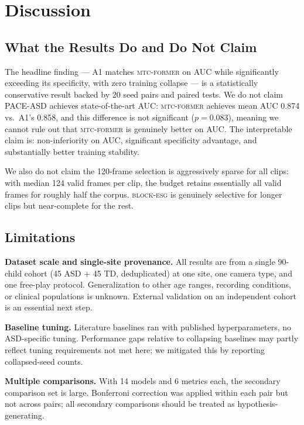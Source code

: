 \documentclass[a4paper,fleqn]{cas-sc}
\newcommand{\besg}{\textsc{block-esg}\xspace}
\newcommand{\mtcf}{\textsc{mtc-former}\xspace}
\begin{document}
\section{Discussion}
\label{sec:disc}

\subsection{What the Results Do and Do Not Claim}

The headline finding --- A1 matches \mtcf on AUC while significantly exceeding
its specificity, with zero training collapse --- is a statistically conservative
result backed by 20 seed pairs and paired tests.
We do not claim PACE-ASD achieves state-of-the-art AUC: \mtcf achieves mean
AUC 0.874 vs.\ A1's 0.858, and this difference is not significant ($p=0.083$),
meaning we cannot rule out that \mtcf is genuinely better on AUC.
The interpretable claim is: non-inferiority on AUC, significant specificity
advantage, and substantially better training stability.

We also do not claim the 120-frame selection is aggressively sparse for all
clips: with median 124 valid frames per clip, the budget retains essentially
all valid frames for roughly half the corpus.
\besg is genuinely selective for longer clips but near-complete for the rest.

\subsection{Limitations}

\textbf{Dataset scale and single-site provenance.}
All results are from a single 90-child cohort (45 ASD + 45 TD, deduplicated)
at one site, one camera type,
and one free-play protocol.
Generalization to other age ranges, recording conditions, or clinical populations
is unknown.
External validation on an independent cohort is an essential next step.

\textbf{Baseline tuning.}
Literature baselines ran with published hyperparameters, no ASD-specific tuning.
Performance gaps relative to collapsing baselines may partly reflect tuning
requirements not met here; we mitigated this by reporting collapsed-seed counts.

\textbf{Multiple comparisons.}
With 14 models and 6 metrics each, the secondary comparison set is large.
Bonferroni correction was applied within each pair but not across pairs;
all secondary comparisons should be treated as hypothesis-generating.
\end{document}
